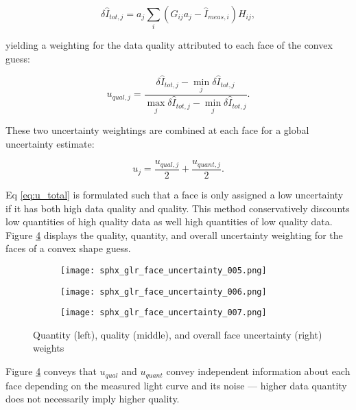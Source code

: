 \begin{equation}
  \delta \hat{I}_{tot,j} = a_j \sum_{i}{\left( G_{ij} a_j - \hat{I}_{meas,i} \right) H_{ij}},
\end{equation}

yielding a weighting for the data quality attributed to each face of the convex guess:

\begin{equation}
  u_{qual,j} = \frac{\delta \hat{I}_{tot,j} - \min_{j}{\delta \hat{I}_{tot,j}}}{\max_{j}{\delta \hat{I}_{tot,j}} - \min_{j}{\delta \hat{I}_{tot,j}}}.
\end{equation}

These two uncertainty weightings are combined at each face for a global uncertainty estimate:

\begin{equation} \label{eq:u_total}
  u_{j} = \frac{u_{qual,j}}{2} + \frac{u_{quant,j}}{2}.
\end{equation}

Eq \ref{eq:u_total} is formulated such that a face is only assigned a low uncertainty if it has both high data quality and quality. This method conservatively discounts low quantities of high quality data as well high quantities of low quality data. Figure \ref{fig:face_uncertainties} displays the quality, quantity, and overall uncertainty weighting for the faces of a convex shape guess.

\begin{figure}
  \centering
  \begin{subfigure}[b]{0.3\textwidth}
      \centering
      \texttt{[image: sphx\_glr\_face\_uncertainty\_005.png]}
      \label{fig:quant_weights}
  \end{subfigure}
  \hfill
  \begin{subfigure}[b]{0.3\textwidth}
      \centering
      \texttt{[image: sphx\_glr\_face\_uncertainty\_006.png]}
      \label{fig:qual_weights}
  \end{subfigure}
  \hfill
  \begin{subfigure}[b]{0.3\textwidth}
      \centering
      \texttt{[image: sphx\_glr\_face\_uncertainty\_007.png]}
      \label{fig:qual_overall}
  \end{subfigure}
  \caption{Quantity (left), quality (middle), and overall face uncertainty (right) weights}
  \label{fig:face_uncertainties}
\end{figure}

Figure \ref{fig:face_uncertainties} conveys that $u_{qual}$ and $u_{quant}$ convey independent information about each face depending on the measured light curve and its noise --- higher data quantity does not necessarily imply higher quality.


